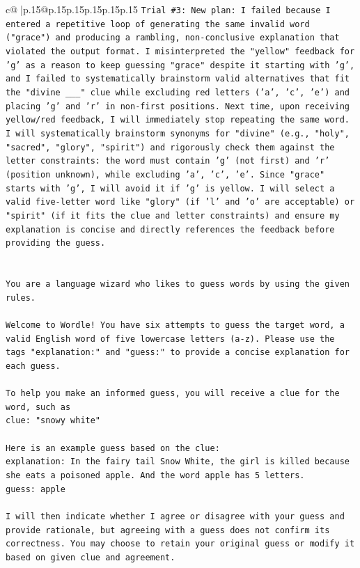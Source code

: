 \documentclass{article}
\begin{document}
{\begin{supertabular}{c@{$\;$}|p{.15\linewidth}@{}p{.15\linewidth}p{.15\linewidth}p{.15\linewidth}p{.15\linewidth}p{.15\linewidth}}
{{{\texttt{Trial \#3: New plan: I failed because I entered a repetitive loop of generating the same invalid word ("grace") and producing a rambling, non{-}conclusive explanation that violated the output format. I misinterpreted the "yellow" feedback for 'g' as a reason to keep guessing "grace" despite it starting with 'g', and I failed to systematically brainstorm valid alternatives that fit the "divine \_\_\_" clue while excluding red letters ('a', 'c', 'e') and placing 'g' and 'r' in non{-}first positions. Next time, upon receiving yellow/red feedback, I will immediately stop repeating the same word. I will systematically brainstorm synonyms for "divine" (e.g., "holy", "sacred", "glory", "spirit") and rigorously check them against the letter constraints: the word must contain 'g' (not first) and 'r' (position unknown), while excluding 'a', 'c', 'e'. Since "grace" starts with 'g', I will avoid it if 'g' is yellow. I will select a valid five{-}letter word like "glory" (if 'l' and 'o' are acceptable) or "spirit" (if it fits the clue and letter constraints) and ensure my explanation is concise and directly references the feedback before providing the guess.} \\
\\ 
\\ 
\texttt{You are a language wizard who likes to guess words by using the given rules.} \\
\\ 
\texttt{Welcome to Wordle! You have six attempts to guess the target word, a valid English word of five lowercase letters (a{-}z). Please use the tags "explanation:" and "guess:" to provide a concise explanation for each guess.} \\
\\ 
\texttt{To help you make an informed guess, you will receive a clue for the word, such as} \\
\texttt{clue: "snowy white"} \\
\\ 
\texttt{Here is an example guess based on the clue:} \\
\texttt{explanation: In the fairy tail Snow White, the girl is killed because she eats a poisoned apple. And the word apple has 5 letters.} \\
\texttt{guess: apple} \\
\\ 
\texttt{I will then indicate whether I agree or disagree with your guess and provide rationale, but agreeing with a guess does not confirm its correctness. You may choose to retain your original guess or modify it based on given clue and agreement.} \\
}}}
\end{supertabular}}
\end{document}
